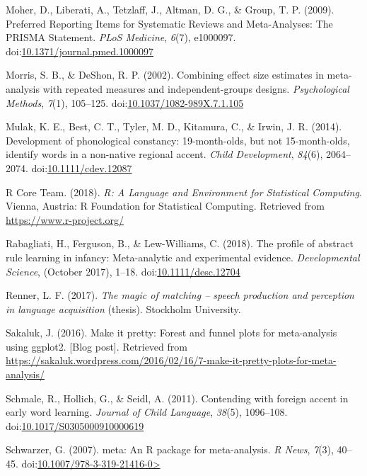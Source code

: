 \documentclass[man]{apa6}
\theoremstyle{definition}
\theoremstyle{definition}
\theoremstyle{definition}
\theoremstyle{remark}
\begin{document}
\hypertarget{ref-Moher2009}{}
Moher, D., Liberati, A., Tetzlaff, J., Altman, D. G., \& Group, T. P.
(2009). Preferred Reporting Items for Systematic Reviews and
Meta-Analyses: The PRISMA Statement. \emph{PLoS Medicine}, \emph{6}(7),
e1000097.
doi:\href{https://doi.org/10.1371/journal.pmed.1000097}{10.1371/journal.pmed.1000097}

\hypertarget{ref-morris2002combining}{}
Morris, S. B., \& DeShon, R. P. (2002). Combining effect size estimates
in meta-analysis with repeated measures and independent-groups designs.
\emph{Psychological Methods}, \emph{7}(1), 105--125.
doi:\href{https://doi.org/10.1037/1082-989X.7.1.105}{10.1037/1082-989X.7.1.105}

\hypertarget{ref-Mulak2014}{}
Mulak, K. E., Best, C. T., Tyler, M. D., Kitamura, C., \& Irwin, J. R.
(2014). Development of phonological constancy: 19-month-olds, but not
15-month-olds, identify words in a non-native regional accent.
\emph{Child Development}, \emph{84}(6), 2064--2074.
doi:\href{https://doi.org/10.1111/cdev.12087}{10.1111/cdev.12087}

\hypertarget{ref-R}{}
R Core Team. (2018). \emph{R: A Language and Environment for Statistical
Computing}. Vienna, Austria: R Foundation for Statistical Computing.
Retrieved from \url{https://www.r-project.org/}

\hypertarget{ref-Rabagliati2018}{}
Rabagliati, H., Ferguson, B., \& Lew-Williams, C. (2018). The profile of
abstract rule learning in infancy: Meta-analytic and experimental
evidence. \emph{Developmental Science}, (October 2017), 1--18.
doi:\href{https://doi.org/10.1111/desc.12704}{10.1111/desc.12704}

\hypertarget{ref-Renner2017}{}
Renner, L. F. (2017). \emph{The magic of matching -- speech production
and perception in language acquisition} (thesis). Stockholm University.

\hypertarget{ref-Sakaluk2016}{}
Sakaluk, J. (2016). Make it pretty: Forest and funnel plots for
meta-analysis using ggplot2. {[}Blog post{]}. Retrieved from
\url{https://sakaluk.wordpress.com/2016/02/16/7-make-it-pretty-plots-for-meta-analysis/}

\hypertarget{ref-Schmale2011}{}
Schmale, R., Hollich, G., \& Seidl, A. (2011). Contending with foreign
accent in early word learning. \emph{Journal of Child Language},
\emph{38}(5), 1096--108.
doi:\href{https://doi.org/10.1017/S0305000910000619}{10.1017/S0305000910000619}

\hypertarget{ref-meta}{}
Schwarzer, G. (2007). meta: An R package for meta-analysis. \emph{R
News}, \emph{7}(3), 40--45.
doi:\href{https://doi.org/10.1007/978-3-319-21416-0\%3E}{10.1007/978-3-319-21416-0\textgreater{}}
\end{document}
